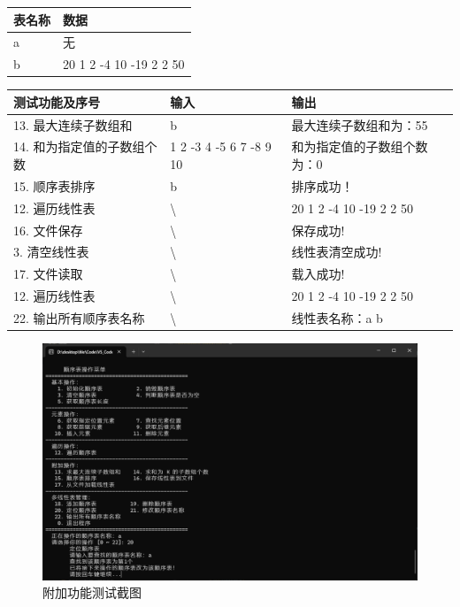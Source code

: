 \documentclass[supercite]{Experimental_Report}
\theoremstyle{definition}
\begin{document}
    \begin{center}
        \setlength{\tabcolsep}{2.0mm}
        \label{table:start-status}
        \begin{tabularx}{\textwidth}{|X|X|}
            \hline
            表名称 & 数据 \\\hline
            a & 无  \\\hline
            b & 20 1 2 -4 10 -19 2 2 50  \\\hline
        \end{tabularx}

        \setlength{\tabcolsep}{2.0mm}
        \label{table:more-seqlist-test}
        \begin{tabularx}{\textwidth}{|X|X|X|}
            \hline
            测试功能及序号 & 输入 & 输出 \\\hline
            13. 最大连续子数组和 & b & 最大连续子数组和为：55 \\\hline
            14. 和为指定值的子数组个数 & 1 2 -3 4 -5 6 7 -8 9 10 & 和为指定值的子数组个数为：0 \\\hline
            15. 顺序表排序 & b & 排序成功！ \\\hline
            12. 遍历线性表 & \textbackslash & 20 1 2 -4 10 -19 2 2 50 \\\hline
            16. 文件保存 & \textbackslash & 保存成功! \\\hline
            3. 清空线性表 & \textbackslash & 线性表清空成功! \\\hline
            17. 文件读取 & \textbackslash & 载入成功! \\\hline
            12. 遍历线性表 & \textbackslash & 20 1 2 -4 10 -19 2 2 50 \\\hline
            22. 输出所有顺序表名称 & \textbackslash & 线性表名称：a b \\\hline
        \end{tabularx}
    \end{center}

\begin{figure}[htb]
	\begin{center}
		\includegraphics[scale=0.30]{images/1-3.jpg}
		\caption{附加功能测试截图}
		\label{fig1-3}
	\end{center}
\end{figure}
\end{document}
